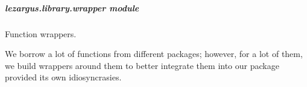 \documentclass[letterpaper,11pt,english]{sphinxmanual}
\begin{document}
\subparagraph{lezargus.library.wrapper module}
\label{\detokenize{code/lezargus.library.wrapper:module-lezargus.library.wrapper}}\label{\detokenize{code/lezargus.library.wrapper:lezargus-library-wrapper-module}}\label{\detokenize{code/lezargus.library.wrapper::doc}}
\sphinxAtStartPar
Function wrappers.

\sphinxAtStartPar
We borrow a lot of functions from different packages; however, for a lot of
them, we build wrappers around them to better integrate them into our
package provided its own idiosyncrasies.
\end{document}
